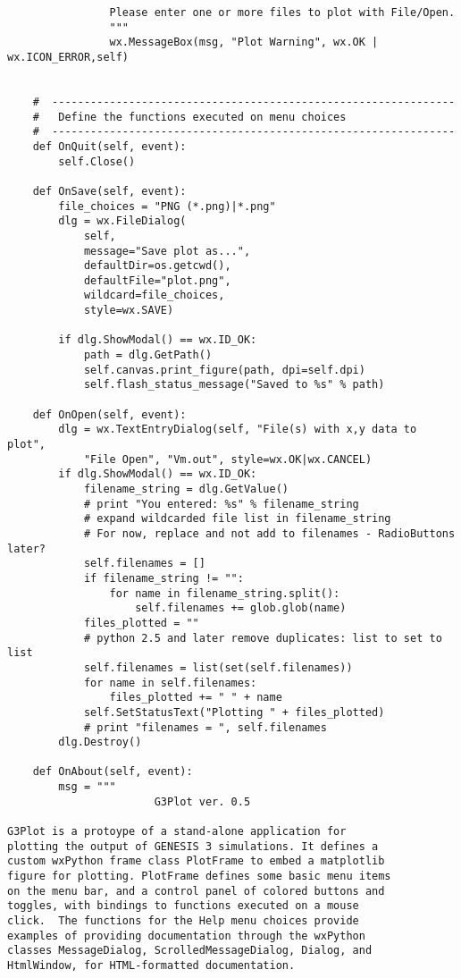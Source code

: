 \documentclass[12pt]{article}
\begin{document}
\begin{verbatim}
                Please enter one or more files to plot with File/Open.
                """
                wx.MessageBox(msg, "Plot Warning", wx.OK | wx.ICON_ERROR,self)


    #  ---------------------------------------------------------------        
    #   Define the functions executed on menu choices
    #  ---------------------------------------------------------------        
    def OnQuit(self, event):
        self.Close()

    def OnSave(self, event):
        file_choices = "PNG (*.png)|*.png"
        dlg = wx.FileDialog(
            self, 
            message="Save plot as...",
            defaultDir=os.getcwd(),
            defaultFile="plot.png",
            wildcard=file_choices,
            style=wx.SAVE)
        
        if dlg.ShowModal() == wx.ID_OK:
            path = dlg.GetPath()
            self.canvas.print_figure(path, dpi=self.dpi)
            self.flash_status_message("Saved to %s" % path)

    def OnOpen(self, event):
        dlg = wx.TextEntryDialog(self, "File(s) with x,y data to plot",
            "File Open", "Vm.out", style=wx.OK|wx.CANCEL)
        if dlg.ShowModal() == wx.ID_OK:
            filename_string = dlg.GetValue()
            # print "You entered: %s" % filename_string     
            # expand wildcarded file list in filename_string
            # For now, replace and not add to filenames - RadioButtons later?
            self.filenames = []
            if filename_string != "":
                for name in filename_string.split():
                    self.filenames += glob.glob(name)
            files_plotted = ""
            # python 2.5 and later remove duplicates: list to set to list
            self.filenames = list(set(self.filenames))
            for name in self.filenames:
                files_plotted += " " + name
            self.SetStatusText("Plotting " + files_plotted)
            # print "filenames = ", self.filenames
        dlg.Destroy()

    def OnAbout(self, event):
        msg = """
                       G3Plot ver. 0.5

G3Plot is a protoype of a stand-alone application for
plotting the output of GENESIS 3 simulations. It defines a
custom wxPython frame class PlotFrame to embed a matplotlib
figure for plotting. PlotFrame defines some basic menu items
on the menu bar, and a control panel of colored buttons and
toggles, with bindings to functions executed on a mouse
click.  The functions for the Help menu choices provide
examples of providing documentation through the wxPython
classes MessageDialog, ScrolledMessageDialog, Dialog, and
HtmlWindow, for HTML-formatted documentation.


\end{verbatim}
\end{document}
